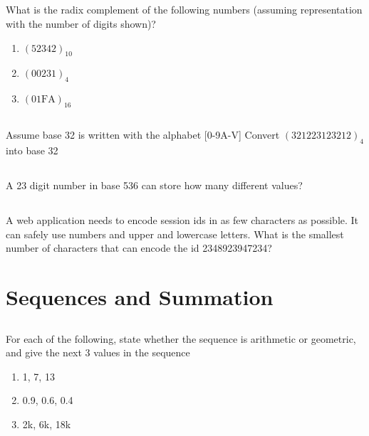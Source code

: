 \documentclass[twocolumn]{article}
\begin{document}
\subsection{}

    What is the radix complement of the following numbers (assuming representation with the number of digits shown)?

    \begin{enumerate}
        \item $(52342)_{10}$
        \item $(00231)_{4}$
        \item $(01\text{FA})_{16}$
    \end{enumerate}

\subsection{}

    Assume base 32 is written with the alphabet [0-9A-V] Convert $(321223123212)_4$ into base 32

\subsection{}

    A 23 digit number in base 536 can store how many different values?

\subsection{}

    A web application needs to encode session ids in as few characters as possible. It can safely use numbers and upper and lowercase letters. What is the smallest number of characters that can encode the id 2348923947234?

\clearpage
\section{Sequences and Summation}

\subsection{}

    For each of the following, state whether the sequence is arithmetic or geometric, and give the next 3 values in the sequence

    \begin{enumerate}
        \item 1, 7, 13
        \item 0.9, 0.6, 0.4
        \item 2k, 6k, 18k
    \end{enumerate}
\end{document}
